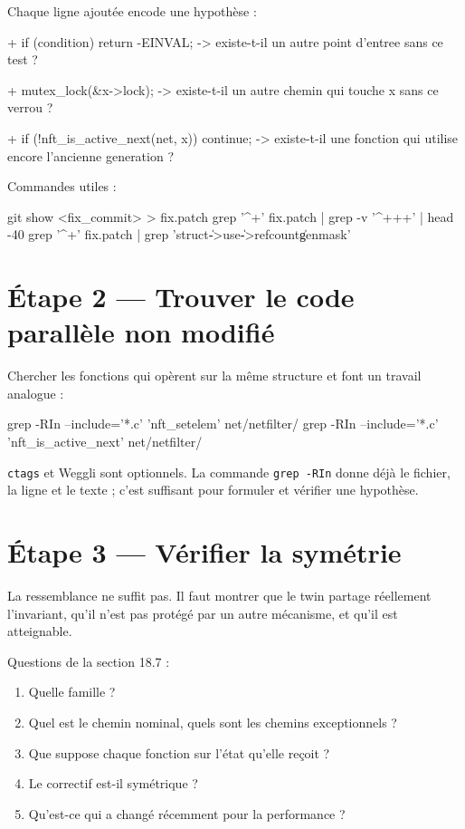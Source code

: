 \documentclass{training}
\begin{document}
Chaque ligne ajoutée encode une hypothèse :

\begin{console}
+ if (condition) return -EINVAL;
  -> existe-t-il un autre point d'entree sans ce test ?

+ mutex_lock(&x->lock);
  -> existe-t-il un autre chemin qui touche x sans ce verrou ?

+ if (!nft_is_active_next(net, x)) continue;
  -> existe-t-il une fonction qui utilise encore l'ancienne generation ?
\end{console}

Commandes utiles :

\begin{console}
git show <fix_commit> > fix.patch
grep '^+' fix.patch | grep -v '^+++' | head -40
grep '^+' fix.patch | grep 'struct\|->use\|->refcount\|genmask'
\end{console}

\section*{Étape 2 --- Trouver le code parallèle non modifié}

Chercher les fonctions qui opèrent sur la même structure et font un travail
analogue :

\begin{console}
grep -RIn --include='*.c' 'nft_setelem' net/netfilter/
grep -RIn --include='*.c' 'nft_is_active_next' net/netfilter/
\end{console}

\texttt{ctags} et Weggli sont optionnels. La commande \texttt{grep -RIn}
donne déjà le fichier, la ligne et le texte ; c'est suffisant pour formuler
et vérifier une hypothèse.

\section*{Étape 3 --- Vérifier la symétrie}

La ressemblance ne suffit pas. Il faut montrer que le twin partage réellement
l'invariant, qu'il n'est pas protégé par un autre mécanisme, et qu'il est
atteignable.

Questions de la section 18.7 :

\begin{enumerate}
  \item Quelle famille ?
  \item Quel est le chemin nominal, quels sont les chemins exceptionnels ?
  \item Que suppose chaque fonction sur l'état qu'elle reçoit ?
  \item Le correctif est-il symétrique ?
  \item Qu'est-ce qui a changé récemment pour la performance ?
\end{enumerate}
\end{document}
